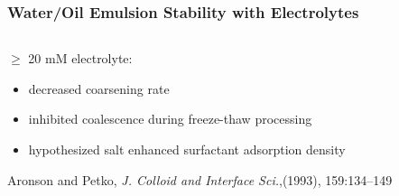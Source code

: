 \documentclass[10pt]{beamer}
\begin{document}
\begin{frame}
 \frametitle{Water/Oil Emulsion Stability with Electrolytes}
\begin{columns}

\begin{column}{0.5\textwidth}
$\geq$ 20 mM electrolyte: \\
\begin{itemize}
 \item decreased coarsening rate
\item inhibited coalescence during freeze-thaw processing
\item hypothesized salt enhanced surfactant adsorption density
\end{itemize}

\vspace{5mm}

Aronson and Petko, {\em J. Colloid and Interface Sci.},(1993), 159:134--149
 \end{column}

 \begin{column}{0.5\textwidth}
 \end{column}
\end{columns}

\end{frame}
\end{document}
